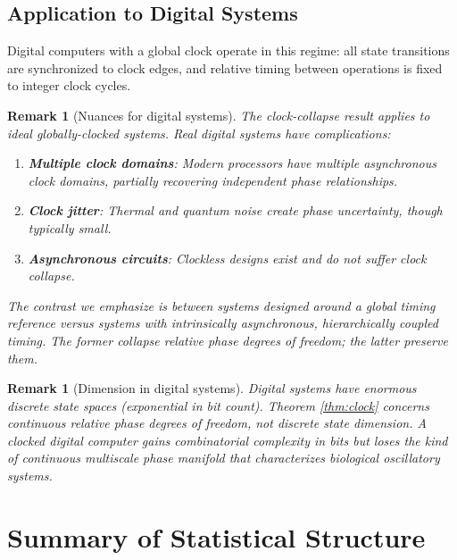 \documentclass[12pt]{article}
\newtheorem{remark}[theorem]{Remark}
\begin{document}
\subsection{Application to Digital Systems}

Digital computers with a global clock operate in this regime: all state transitions are synchronized to clock edges, and relative timing between operations is fixed to integer clock cycles.

\begin{remark}[Nuances for digital systems]
\label{rem:digital}
The clock-collapse result applies to \emph{ideal globally-clocked systems}. Real digital systems have complications:
\begin{enumerate}
    \item \textbf{Multiple clock domains}: Modern processors have multiple asynchronous clock domains, partially recovering independent phase relationships.
    \item \textbf{Clock jitter}: Thermal and quantum noise create phase uncertainty, though typically small.
    \item \textbf{Asynchronous circuits}: Clockless designs exist and do not suffer clock collapse.
\end{enumerate}
The contrast we emphasize is between \emph{systems designed around a global timing reference} versus \emph{systems with intrinsically asynchronous, hierarchically coupled timing}. The former collapse relative phase degrees of freedom; the latter preserve them.
\end{remark}

\begin{remark}[Dimension in digital systems]
Digital systems have enormous \emph{discrete} state spaces (exponential in bit count). Theorem \ref{thm:clock} concerns \emph{continuous relative phase} degrees of freedom, not discrete state dimension. A clocked digital computer gains combinatorial complexity in bits but loses the kind of continuous multiscale phase manifold that characterizes biological oscillatory systems.
\end{remark}

\section{Summary of Statistical Structure}
\label{sec:summary}
\end{document}
